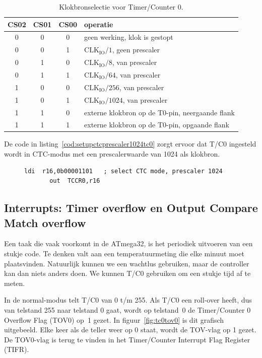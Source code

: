 \begin{table}[!ht]
\centering
\caption{Klokbronselectie voor Timer/Counter 0.}
\label{tab:timklokselectie0}
\renewcommand\arraystretch{1.2}
\begin{tabu} to 0.5\textwidth{ccc|l}
CS02 & CS01 & CS00 & operatie \\   &   0  &   0  & geen werking, klok is gestopt\\
  0  &   0  &   1  & $\text{CLK}_\text{IO}/1$, geen prescaler \\
  0  &   1  &   0  & $\text{CLK}_\text{IO}/8$, van prescaler \\ 
  0  &   1  &   1  & $\text{CLK}_\text{IO}/64$, van prescaler \\
  1  &   0  &   0  & $\text{CLK}_\text{IO}/256$, van prescaler \\
  1  &   0  &   1  & $\text{CLK}_\text{IO}/1024$, van prescaler \\
  1  &   1  &   0  & externe klokbron op de T0-pin, neergaande flank \\
  1  &   1  &   1  & externe klokbron op de T0-pin, opgaande flank \\
\end{tabu}
\end{table}

De code in listing~\ref{cod:setupctcprescaler1024tc0} zorgt ervoor dat T/C0
ingesteld wordt in CTC-modus met een prescalerwaarde van 1024 als klokbron.

\begin{figure}[!ht]
\begin{lstlisting}[language=AVRassembler,caption=Selectie van CTC-modus en prescaler 1024.,label=cod:setupctcprescaler1024tc0]
       ldi  r16,0b00001101   ; select CTC mode, prescaler 1024
       out  TCCR0,r16
\end{lstlisting}
\end{figure}

\subsection{Interrupts: Timer overflow en Output Compare Match overflow}
Een taak die vaak voorkomt in de ATmega32, is het periodiek uitvoeren
van een stukje code. Te denken valt aan een temperatuurmeting die elke
minuut moet plaatsvinden. Natuurlijk kunnen we een wachtlus gebruiken,
maar de controller kan dan niets anders doen. We kunnen T/C0 gebruiken
om een stukje tijd af te meten.

In de normal-modus telt T/C0 van 0 t/m 255.
Als T/C0 een roll-over heeft, dus van telstand 255 naar telstand 0 gaat,
wordt op telstand~0 de Timer/Counter 0 Overflow Flag (TOV0) op~1 gezet.
In figuur~\ref{fig:tc0tov0} is dit grafisch uitgebeeld. Elke keer als
de teller weer op 0 staat, wordt de TOV-vlag op 1 gezet. De TOV0-vlag is
terug te vinden in het Timer/Counter Interrupt Flag Register (TIFR).

